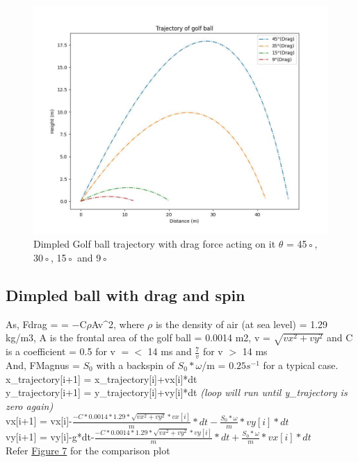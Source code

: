 \documentclass[11pt]{article}
\begin{document}
\begin{figure}[b]
    \centering
    \includegraphics[width=\textwidth, height=\textheight, keepaspectratio]{Golf_Trajectory_Smooth_Drag.jpeg}
    \caption{Dimpled Golf ball trajectory with drag force acting on it $\theta$ = 45◦, 30◦, 15◦ and 9◦}
    \label{fig:Dimpled_Fdrag_trajectory}
\end{figure}

\subsection{Dimpled ball with drag and spin}
As, Fdrag = = −C$\rho$Av^2, where $\rho$ is the density of air (at sea level) = 1.29 kg/m3, A is the frontal area of the golf ball = 0.0014 m2, v = $\sqrt{vx^2+vy^2}$ and C is a coefficient = 0.5 for v $=<$ 14 m\/s and $\frac{7}{v}$ for v $>$ 14 m\/s\\
And, FMagnus = $S_0$  with a backspin of $S_0 * \omega$/m = $0.25 s^{−1}$ for a typical case.\\
x\_trajectory[i+1] = x\_trajectory[i]+vx[i]*dt\\
y\_trajectory[i+1] = y\_trajectory[i]+vy[i]*dt \textit{(loop will run until y\_trajectory is zero again)}\\
vx[i+1] = vx[i]-$\frac{-C*0.0014*1.29*\sqrt{vx^2+vy^2}*vx[i]}{m}*dt - \frac{S_0 * \omega}{m}*vy[i]*dt$\\
vy[i+1] = vy[i]-g*dt-$\frac{-C*0.0014*1.29*\sqrt{vx^2+vy^2}*vy[i]}{m}*dt + \frac{S_0 * \omega}{m}*vx[i]*dt$\\
Refer \hyperref[fig:Spin_Dimpled_Fdrag_trajectory]{Figure 7} for the comparison plot
\end{document}
